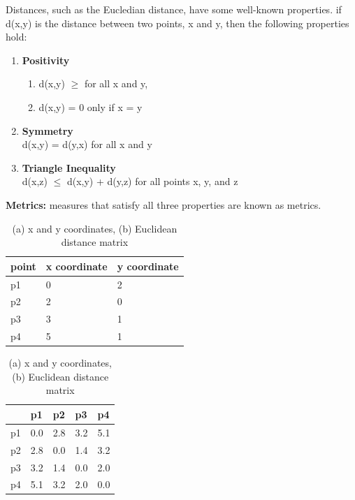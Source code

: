 	Distances, such as the Eucledian distance, have some well-known properties. if
	d(x,y) is the distance between two points, x and y, then the following properties
	hold:

		\begin{enumerate}
			\item {\bf Positivity}
			\begin{enumerate}
				\item d(x,y) $\geq$ for all x and y,
				\item d(x,y) = 0 only if x = y
			\end{enumerate}
			\item {\bf Symmetry} \\
				d(x,y) = d(y,x) for all x and y
			\item {\bf Triangle Inequality} \\
				d(x,z) $\leq$ d(x,y) + d(y,z) for all points x, y, and z
		\end{enumerate}

	{\bf Metrics: } measures that satisfy all three properties are known as metrics.

	\begin{table}[H]
		\centering
		\begin{tabular}{| l | l | l |}
			\hline
			point & x coordinate & y coordinate \\ \hline
			p1 & 0 & 2 \\ \hline
			p2 & 2 & 0 \\ \hline
			p3 & 3 & 1 \\ \hline
			p4 & 5 & 1 \\ \hline
		\end{tabular}
		\begin{tabular}{| l | l | l | l | l |}
			\hline
			 & p1 & p2 & p3 & p4 \\ \hline
			p1 & 0.0 & 2.8 & 3.2 & 5.1 \\ \hline
			p2 & 2.8 & 0.0 & 1.4 & 3.2 \\ \hline
			p3 & 3.2 & 1.4 & 0.0 & 2.0 \\ \hline
			p4 & 5.1 & 3.2 & 2.0 & 0.0 \\ \hline
		\end{tabular}
		\caption{(a) x and y coordinates, (b) Euclidean distance matrix}
	\end{table}

